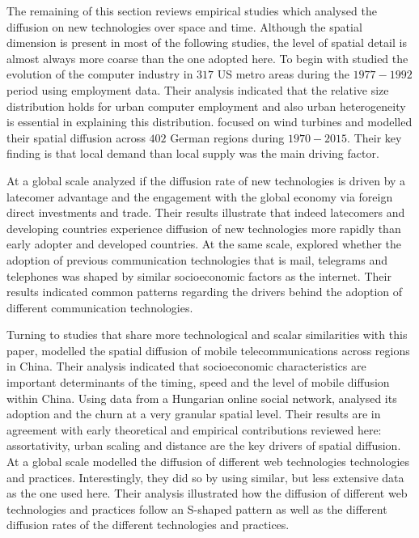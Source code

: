 \documentclass[
  authoryear,
  preprint,
  3p]{elsarticle}
\begin{document}
The remaining of this section reviews empirical studies which analysed
the diffusion on new technologies over space and time. Although the
spatial dimension is present in most of the following studies, the level
of spatial detail is almost always more coarse than the one adopted
here. To begin with \citet{beardsell1999spatial} studied the evolution
of the computer industry in \(317\) US metro areas during the
\(1977-1992\) period using employment data. Their analysis indicated
that the relative size distribution holds for urban computer employment
and also urban heterogeneity is essential in explaining this
distribution. \citet{bednarz2020pulled} focused on wind turbines and
modelled their spatial diffusion across \(402\) German regions during
\(1970-2015\). Their key finding is that local demand than local supply
was the main driving factor.

At a global scale \citet{perkins2005international} analyzed if the
diffusion rate of new technologies is driven by a latecomer advantage
and the engagement with the global economy via foreign direct
investments and trade. Their results illustrate that indeed latecomers
and developing countries experience diffusion of new technologies more
rapidly than early adopter and developed countries. At the same scale,
\citet{perkins2011internet} explored whether the adoption of previous
communication technologies that is mail, telegrams and telephones was
shaped by similar socioeconomic factors as the internet. Their results
indicated common patterns regarding the drivers behind the adoption of
different communication technologies.

Turning to studies that share more technological and scalar similarities
with this paper, \citet{ding2010modeling} modelled the spatial diffusion
of mobile telecommunications across regions in China. Their analysis
indicated that socioeconomic characteristics are important determinants
of the timing, speed and the level of mobile diffusion within China.
Using data from a Hungarian online social network,
\citet{lengyel2020role} analysed its adoption and the churn at a very
granular spatial level. Their results are in agreement with early
theoretical and empirical contributions reviewed here: assortativity,
urban scaling and distance are the key drivers of spatial diffusion. At
a global scale \citet{PAPAGIANNIDIS2015308} modelled the diffusion of
different web technologies technologies and practices. Interestingly,
they did so by using similar, but less extensive data as the one used
here. Their analysis illustrated how the diffusion of different web
technologies and practices follow an S-shaped pattern as well as the
different diffusion rates of the different technologies and practices.
\end{document}
